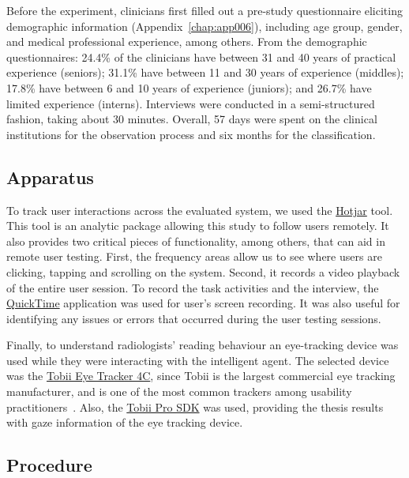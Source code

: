 \vspace{2.00mm}

Before the experiment, clinicians first filled out a pre-study questionnaire eliciting demographic information (Appendix~\ref{chap:app006}), including age group, gender, and medical professional experience, among others.
From the demographic questionnaires:
24.4\% of the clinicians have between 31 and 40 years of practical experience (seniors);
31.1\% have between 11 and 30 years of experience (middles);
17.8\% have between 6 and 10 years of experience (juniors); and
26.7\% have limited experience (interns).
Interviews were conducted in a semi-structured fashion, taking about 30 minutes.
Overall, 57 days were spent on the clinical institutions for the observation process and six months for the classification.

\subsection{Apparatus}
\label{sec:app002005002}

To track user interactions across the evaluated system, we used the \hyperlink{https://www.hotjar.com/}{Hotjar} tool.
This tool is an analytic package allowing this study to follow users remotely.
It also provides two critical pieces of functionality, among others, that can aid in remote user testing.
First, the frequency areas allow us to see where users are clicking, tapping and scrolling on the system.
Second, it records a video playback of the entire user session.
To record the task activities and the interview, the \hyperlink{https://support.apple.com/downloads/quicktime}{QuickTime} application was used for user's screen recording.
It was also useful for identifying any issues or errors that occurred during the user testing sessions.

Finally, to understand radiologists' reading behaviour an eye-tracking device was used while they were interacting with the intelligent agent.
The selected device was the \hyperlink{https://gaming.tobii.com/product/tobii-eye-tracker-4c/}{Tobii Eye Tracker 4C}, since Tobii is the largest commercial eye tracking manufacturer, and is one of the most common trackers among usability practitioners~\cite{CALISTO2021102607}.
Also, the \hyperlink{https://www.tobiipro.com/product-listing/tobii-pro-sdk/}{Tobii Pro SDK} was used, providing the thesis results with gaze information of the eye tracking device.

\subsection{Procedure}
\label{sec:chap005005003}

